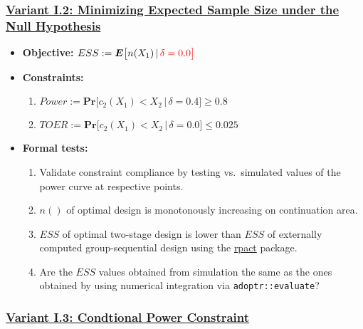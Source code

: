 \documentclass[]{book}
\providecommand{\tightlist}{%
  \setlength{\itemsep}{0pt}\setlength{\parskip}{0pt}}
\begin{document}
\hypertarget{variant-i.2-minimizing-expected-sample-size-under-the-null-hypothesis}{%
\subsubsection{\texorpdfstring{\protect\hyperlink{variantI_2}{Variant I.2: Minimizing Expected Sample Size under the Null Hypothesis}}{Variant I.2: Minimizing Expected Sample Size under the Null Hypothesis}}\label{variant-i.2-minimizing-expected-sample-size-under-the-null-hypothesis}}

\begin{itemize}
\tightlist
\item
  \textbf{Objective:} \(ESS := \boldsymbol{E}\big[n(X_1)\,|\,\color{red}{\delta=0.0}\big]\)
\item
  \textbf{Constraints:}

  \begin{enumerate}
  \def\labelenumi{\arabic{enumi}.}
  \tightlist
  \item
    \(Power := \boldsymbol{Pr}\big[c_2(X_1) < X_2\,|\,\delta=0.4\big] \geq 0.8\)
  \item
    \(TOER := \boldsymbol{Pr}\big[c_2(X_1) < X_2\,|\,\delta=0.0\big] \leq 0.025\)
  \end{enumerate}
\item
  \textbf{Formal tests:}

  \begin{enumerate}
  \def\labelenumi{\arabic{enumi}.}
  \tightlist
  \item
    Validate constraint compliance by testing vs.~simulated
    values of the power curve at respective points.
  \item
    \(n()\) of optimal design is monotonously increasing on continuation area.
  \item
    \(ESS\) of optimal two-stage design is lower than \(ESS\) of externally
    computed group-sequential design using the \href{https://rpact.org/}{rpact} package.
  \item
    Are the \(ESS\) values obtained from simulation the same as the ones
    obtained by using numerical integration via \texttt{adoptr::evaluate}?
  \end{enumerate}
\end{itemize}

\hypertarget{variant-i.3-condtional-power-constraint}{%
\subsubsection{\texorpdfstring{\protect\hyperlink{variantI_3}{Variant I.3: Condtional Power Constraint}}{Variant I.3: Condtional Power Constraint}}\label{variant-i.3-condtional-power-constraint}}
\end{document}
